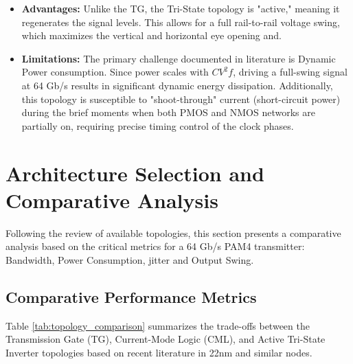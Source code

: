 \begin{itemize}
    \item \textbf{Advantages:} Unlike the TG, the Tri-State topology is "active," meaning it regenerates the signal levels. This allows for a full rail-to-rail voltage swing, which maximizes the vertical and horizontal eye opening and.
    \item \textbf{Limitations:} The primary challenge documented in literature is Dynamic Power consumption. Since power scales with $CV^2f$, driving a full-swing signal at 64 Gb/s results in significant dynamic energy dissipation. Additionally, this topology is susceptible to "shoot-through" current (short-circuit power) during the brief moments when both PMOS and NMOS networks are partially on, requiring precise timing control of the clock phases.
\end{itemize}
\newpage
\section{Architecture Selection and Comparative Analysis}
\label{sec:arch_selection}

Following the review of available topologies, this section presents a comparative analysis based on the critical metrics for a 64 Gb/s PAM4 transmitter: Bandwidth, Power Consumption, jitter and Output Swing.

\subsection{Comparative Performance Metrics}
Table \ref{tab:topology_comparison} summarizes the trade-offs between the Transmission Gate (TG), Current-Mode Logic (CML), and Active Tri-State Inverter topologies based on recent literature in 22nm and similar nodes.

